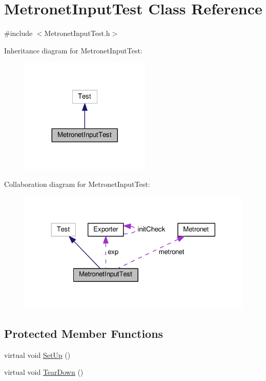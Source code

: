 \hypertarget{class_metronet_input_test}{}\section{Metronet\+Input\+Test Class Reference}
\label{class_metronet_input_test}


{\ttfamily \#include $<$Metronet\+Input\+Test.\+h$>$}



Inheritance diagram for Metronet\+Input\+Test\+:\nopagebreak
\begin{figure}[H]
\begin{center}
\leavevmode
\includegraphics[width=176pt]{class_metronet_input_test__inherit__graph}
\end{center}
\end{figure}


Collaboration diagram for Metronet\+Input\+Test\+:\nopagebreak
\begin{figure}[H]
\begin{center}
\leavevmode
\includegraphics[width=324pt]{class_metronet_input_test__coll__graph}
\end{center}
\end{figure}
\subsection*{Protected Member Functions}
\begin{DoxyCompactItemize}
\item 
virtual void \hyperlink{class_metronet_input_test_a863299908a545656568a7d534387e05d}{Set\+Up} ()
\item 
virtual void \hyperlink{class_metronet_input_test_a20f35cb70be79eee36b1dab816cf6806}{Tear\+Down} ()
\end{DoxyCompactItemize}
